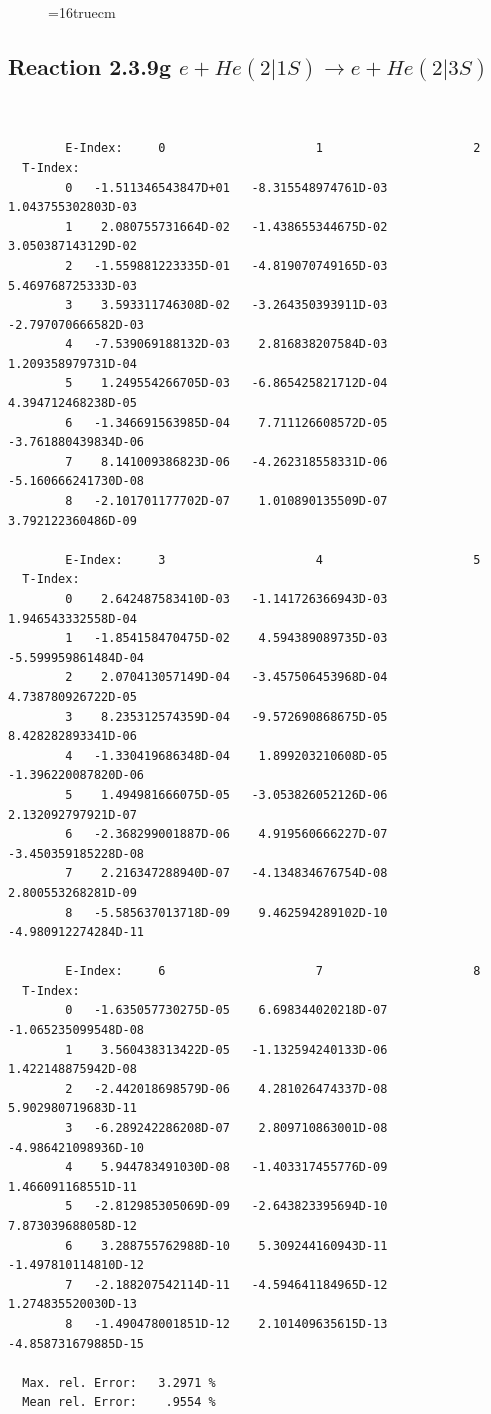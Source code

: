 \documentclass[12pt,dvips]{article}
\begin{document}
\begin{figure} \label{2.3.9f}
\epsfxsize=16truecm
\end{figure}
\newpage

\subsection{
Reaction 2.3.9g $ e + He(2|1S) \rightarrow e + He(2|3S) $
}




\begin{small}\begin{verbatim}


        E-Index:     0                     1                     2
  T-Index:
        0   -1.511346543847D+01   -8.315548974761D-03    1.043755302803D-03
        1    2.080755731664D-02   -1.438655344675D-02    3.050387143129D-02
        2   -1.559881223335D-01   -4.819070749165D-03    5.469768725333D-03
        3    3.593311746308D-02   -3.264350393911D-03   -2.797070666582D-03
        4   -7.539069188132D-03    2.816838207584D-03    1.209358979731D-04
        5    1.249554266705D-03   -6.865425821712D-04    4.394712468238D-05
        6   -1.346691563985D-04    7.711126608572D-05   -3.761880439834D-06
        7    8.141009386823D-06   -4.262318558331D-06   -5.160666241730D-08
        8   -2.101701177702D-07    1.010890135509D-07    3.792122360486D-09

        E-Index:     3                     4                     5
  T-Index:
        0    2.642487583410D-03   -1.141726366943D-03    1.946543332558D-04
        1   -1.854158470475D-02    4.594389089735D-03   -5.599959861484D-04
        2    2.070413057149D-04   -3.457506453968D-04    4.738780926722D-05
        3    8.235312574359D-04   -9.572690868675D-05    8.428282893341D-06
        4   -1.330419686348D-04    1.899203210608D-05   -1.396220087820D-06
        5    1.494981666075D-05   -3.053826052126D-06    2.132092797921D-07
        6   -2.368299001887D-06    4.919560666227D-07   -3.450359185228D-08
        7    2.216347288940D-07   -4.134834676754D-08    2.800553268281D-09
        8   -5.585637013718D-09    9.462594289102D-10   -4.980912274284D-11

        E-Index:     6                     7                     8
  T-Index:
        0   -1.635057730275D-05    6.698344020218D-07   -1.065235099548D-08
        1    3.560438313422D-05   -1.132594240133D-06    1.422148875942D-08
        2   -2.442018698579D-06    4.281026474337D-08    5.902980719683D-11
        3   -6.289242286208D-07    2.809710863001D-08   -4.986421098936D-10
        4    5.944783491030D-08   -1.403317455776D-09    1.466091168551D-11
        5   -2.812985305069D-09   -2.643823395694D-10    7.873039688058D-12
        6    3.288755762988D-10    5.309244160943D-11   -1.497810114810D-12
        7   -2.188207542114D-11   -4.594641184965D-12    1.274835520030D-13
        8   -1.490478001851D-12    2.101409635615D-13   -4.858731679885D-15

  Max. rel. Error:   3.2971 %
  Mean rel. Error:    .9554 %



\end{verbatim}\end{small}
\end{document}
